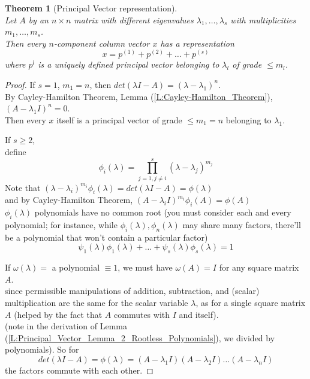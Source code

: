 \documentclass[twoside]{amsart}
\theoremstyle{plain}
\newtheorem{theorem}{Theorem}
\theoremstyle{definition}
\begin{document}
\begin{theorem}[Principal Vector representation]\label{T:Principal_Vector_Representation} \quad \\
  Let $A$ by an $n \times n$ matrix with different eigenvalues $\lambda_1, \dots, \lambda_s$ with multiplicities $m_1, \dots, m_s$.  \\
  \phantom{Le} Then every $n$-component column vector $x$ has a representation 
  \begin{equation}
    x= p^{(1)} + p^{(2)} + \dots + p^{(s)}
  \end{equation}
where $p^l$ is a uniquely defined principal vector belonging to $\lambda_l$ of grade $\leq m_l$.  
\end{theorem}
\begin{proof}
If $s=1$, $m_1 = n$, then $det(\lambda I-A) = (\lambda -\lambda_1)^n $.  \\
\phantom{If $s=1$} By Cayley-Hamilton Theorem, Lemma (\ref{L:Cayley-Hamilton_Theorem}), $(A-\lambda_1 I)^n =0 $. \\  
\phantom{If} Then every $x$ itself is a principal vector of grade $\leq m_1 = n$ belonging to $\lambda_1$.  

If $s\geq 2$, \\ 
\phantom{If} define
\[
\phi_i(\lambda) = \prod_{j=1,j\neq i}^s (\lambda - \lambda_j)^{m_j}
\]
\phantom{If defi} \footnotesize{ Note that $(\lambda - \lambda_i)^{m_i} \phi_i(\lambda) = det(\lambda I -A) = \phi(\lambda) $ \\
  \phantom{If defi Note th} and by Cayley-Hamilton Theorem, $(A - \lambda_i I)^{m_i} \phi_i(A) = \phi(A)$ \\ 
  \phantom{If de} $\phi_i(\lambda)$ polynomials have no common root (you must consider each and every polynomial; for instance, while $\phi_i(\lambda), \phi_n(\lambda)$ may share many factors, there'll be a polynomial that won't contain a particular factor)
}
\normalsize
\[
\psi_1(\lambda) \phi_1(\lambda) + \dots + \psi_s(\lambda)\phi_s(\lambda) = 1
\]

If $\omega(\lambda) = $ a polynomial $\equiv 1$, we must have $\omega(A) = I$ for any square matrix $A$.  \\
\phantom{ If} since permissible manipulations of addition, subtraction, and (scalar) multiplication are the same for the scalar variable $\lambda$, as for a single square matrix $A$ (helped by the fact that $A$ commutes with $I$ and itself).  \\
\phantom{ If since} (note in the derivation of Lemma (\ref{L:Principal_Vector_Lemma_2_Rootless_Polynomials}), we divided by polynomials).  
So for 
\[
det(\lambda I - A) = \phi(\lambda) = (A -\lambda_1 I)(A-\lambda_2 I) \dots (A- \lambda_n I) 
\]
the factors commute with each other.  


\end{proof}
\end{document}
